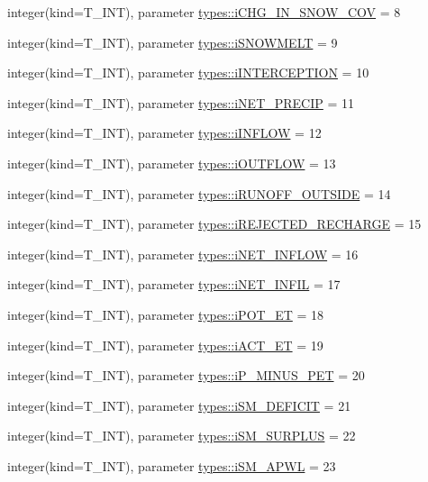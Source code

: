 \begin{DoxyCompactItemize}
integer(kind=T\_\-INT), parameter \hyperlink{namespacetypes_aa1bee1fd3093347686b80dcfe4d610a9}{types::iCHG\_\-IN\_\-SNOW\_\-COV} = 8
\item 
integer(kind=T\_\-INT), parameter \hyperlink{namespacetypes_a356a0c0b5930e94118b467d1f7b486f2}{types::iSNOWMELT} = 9
\item 
integer(kind=T\_\-INT), parameter \hyperlink{namespacetypes_abbe2d030deced65481aa7f6447173269}{types::iINTERCEPTION} = 10
\item 
integer(kind=T\_\-INT), parameter \hyperlink{namespacetypes_a5f9046fed07889a2ac6a854e9563e96a}{types::iNET\_\-PRECIP} = 11
\item 
integer(kind=T\_\-INT), parameter \hyperlink{namespacetypes_a76a571421076f0030f2ecf4ab852504d}{types::iINFLOW} = 12
\item 
integer(kind=T\_\-INT), parameter \hyperlink{namespacetypes_ad2090785f42112bf8cf46d637279bc2c}{types::iOUTFLOW} = 13
\item 
integer(kind=T\_\-INT), parameter \hyperlink{namespacetypes_aab5c72102086046b4f2dbaab08ccb75b}{types::iRUNOFF\_\-OUTSIDE} = 14
\item 
integer(kind=T\_\-INT), parameter \hyperlink{namespacetypes_ae14eacf3547df95bf9f8678645f92a42}{types::iREJECTED\_\-RECHARGE} = 15
\item 
integer(kind=T\_\-INT), parameter \hyperlink{namespacetypes_a42742629ae90d31afa09e1250d647875}{types::iNET\_\-INFLOW} = 16
\item 
integer(kind=T\_\-INT), parameter \hyperlink{namespacetypes_a6c9ee6a446b45c2636429fb1dabdad33}{types::iNET\_\-INFIL} = 17
\item 
integer(kind=T\_\-INT), parameter \hyperlink{namespacetypes_a5c8388d67ca88816f13bf84e0247c604}{types::iPOT\_\-ET} = 18
\item 
integer(kind=T\_\-INT), parameter \hyperlink{namespacetypes_a5d7a9e58cc5060c7fdfc7466a8f52a60}{types::iACT\_\-ET} = 19
\item 
integer(kind=T\_\-INT), parameter \hyperlink{namespacetypes_adbfd806dc2d35d39c7984aa32d3a9bed}{types::iP\_\-MINUS\_\-PET} = 20
\item 
integer(kind=T\_\-INT), parameter \hyperlink{namespacetypes_a87837f70eb7d1089df9cb4595c0f7811}{types::iSM\_\-DEFICIT} = 21
\item 
integer(kind=T\_\-INT), parameter \hyperlink{namespacetypes_aa8ff1cbf3a33f80c5d9a66d6eca11e11}{types::iSM\_\-SURPLUS} = 22
\item 
integer(kind=T\_\-INT), parameter \hyperlink{namespacetypes_a65e055348b61912a3790d7b3f4c9bf0a}{types::iSM\_\-APWL} = 23

\end{DoxyCompactItemize}

